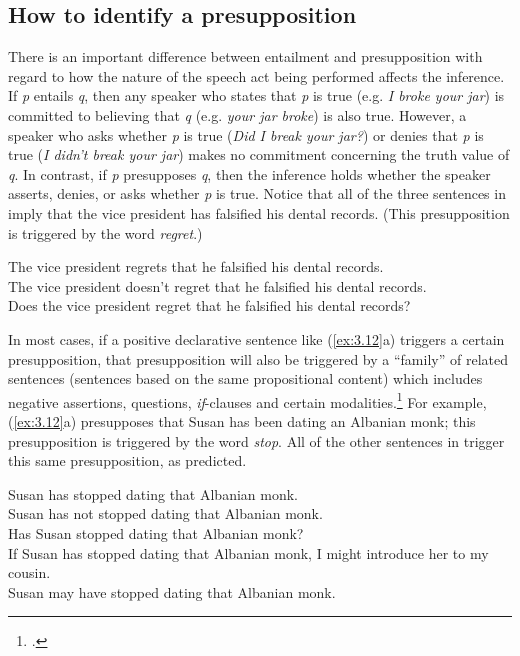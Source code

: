 \subsection{How to identify a presupposition}\label{sec:} %

There is an important difference between entailment and presupposition with regard to how the nature of the speech act being performed affects the inference. If \textit{p} entails \textit{q}, then any speaker who states that \textit{p} is true (e.g. \textit{I broke your jar}) is committed to believing that \textit{q} (e.g. \textit{your jar broke}) is also true. However, a speaker who asks whether \textit{p} is true (\textit{Did I break your jar?}) or denies that \textit{p} is true (\textit{I didn’t break your jar}) makes no commitment concerning the truth value of \textit{q}. In contrast, if \textit{p} presupposes \textit{q}, then the inference holds whether the speaker asserts, denies, or asks whether \textit{p} is true. Notice that all of the three sentences in  imply that the vice president has falsified his dental records. (This presupposition is triggered by the word \textit{regret}.)


\ea \label{ex:3.11}
\ea The vice president regrets that he falsified his dental records.\\
\ex The vice president doesn’t regret that he falsified his dental records.\\
\ex Does the vice president regret that he falsified his dental records?
                       \z
\z


In most cases, if a positive declarative sentence like (\ref{ex:3.12}a) triggers a certain presupposition, that presupposition will also be triggered by a “family” of related sentences (sentences based on the same propositional content) which includes negative assertions, questions, \textit{if}-clauses and certain modalities.\footnote{\citet{CherchiaMcConnell-Ginet1990}.} For example, (\ref{ex:3.12}a) presupposes that Susan has been dating an Albanian monk; this presupposition is triggered by the word \textit{stop}. All of the other sentences in  trigger this same presupposition, as predicted.


\ea \label{ex:3.12}
\ea Susan has stopped dating that Albanian monk.\\ 
\ex Susan has not stopped dating that Albanian monk.\\
\ex Has Susan stopped dating that Albanian monk?\\
\ex If Susan has stopped dating that Albanian monk, I might introduce her to my cousin.\\
\ex Susan may have stopped dating that Albanian monk.
                       \z
\z


